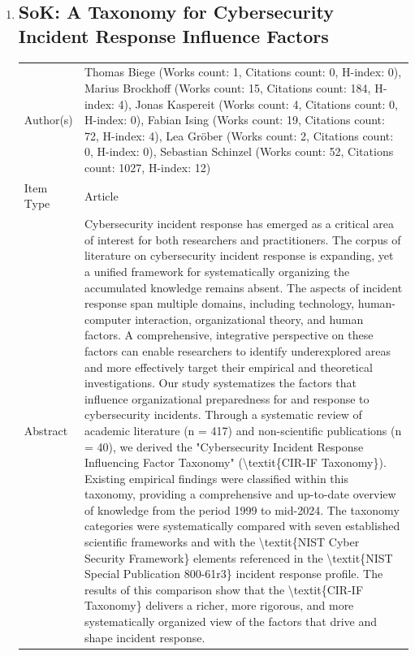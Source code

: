 \documentclass{article}
\begin{document}
\begin{enumerate}[label=\arabic*., font=\Large]
\item
{}\label{sok-a-taxonomy-for-cybersecurity-incident-response-influence-factors}
\hypertarget{item_BIEGESoKTaxonomyCybersecurityIncidentResponseInfluence2026}{}
\subsection*{SoK: A Taxonomy for Cybersecurity Incident Response Influence Factors}

\begin{longtable}{p{} p{\contentcolwidth-2\tabcolsep}}
\toprule
Author(s) & Thomas Biege (Works count: 1, Citations count: 0, H-index: 0), Marius Brockhoff (Works count: 15, Citations count: 184, H-index: 4), Jonas Kaspereit (Works count: 4, Citations count: 0, H-index: 0), Fabian Ising (Works count: 19, Citations count: 72, H-index: 4), Lea Gröber (Works count: 2, Citations count: 0, H-index: 0), Sebastian Schinzel (Works count: 52, Citations count: 1027, H-index: 12) \\
Item Type & Article \\
Abstract & Cybersecurity incident response has emerged as a critical area of interest for both researchers and practitioners. The corpus of literature on cybersecurity incident response is expanding, yet a unified framework for systematically organizing the accumulated knowledge remains absent. The aspects of incident response span multiple domains, including technology, human-computer interaction, organizational theory, and human factors. A comprehensive, integrative perspective on these factors can enable researchers to identify underexplored areas and more effectively target their empirical and theoretical investigations. Our study systematizes the factors that influence organizational preparedness for and response to cybersecurity incidents. Through a systematic review of academic literature (n = 417) and non-scientific publications (n = 40), we derived the "Cybersecurity Incident Response Influencing Factor Taxonomy" (\textbackslash{}textit\{CIR-IF Taxonomy\}). Existing empirical findings were classified within this taxonomy, providing a comprehensive and up-to-date overview of knowledge from the period 1999 to mid-2024. The taxonomy categories were systematically compared with seven established scientific frameworks and with the \textbackslash{}textit\{NIST Cyber Security Framework\} elements referenced in the \textbackslash{}textit\{NIST Special Publication 800-61r3\} incident response profile. The results of this comparison show that the \textbackslash{}textit\{CIR-IF Taxonomy\} delivers a richer, more rigorous, and more systematically organized view of the factors that drive and shape incident response. \\

\end{longtable}
\end{enumerate}
\end{document}
